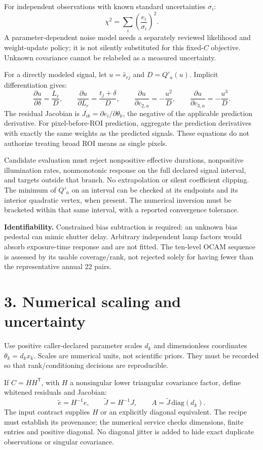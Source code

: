 \documentclass[11pt,a4paper]{article}
\begin{document}
For independent observations with known standard uncertainties $\sigma_i$:
\[
\chi^2=\sum_i\left(\frac{e_i}{\sigma_i}\right)^2 .
\]
A parameter-dependent noise model needs a separately reviewed likelihood and
weight-update policy; it is not silently substituted for this fixed-$C$ objective.
Unknown covariance cannot be relabeled as a measured uncertainty.

For a directly modeled signal, let $u=\widehat s_{rj}$ and $D=Q'_a(u)$.
Implicit differentiation gives:
\[
\frac{\partial u}{\partial\delta}=\frac{L_r}{D},
\qquad
\frac{\partial u}{\partial L_r}=\frac{t_j+\delta}{D},
\qquad
\frac{\partial u}{\partial c_{2,a}}=-\frac{u^2}{D},
\qquad
\frac{\partial u}{\partial c_{3,a}}=-\frac{u^3}{D}.
\]
The residual Jacobian is $J_{ik}=\partial e_i/\partial\theta_k$, the negative of
the applicable prediction derivative. For pixel-before-ROI prediction, aggregate
the prediction derivatives with exactly the same weights as the predicted
signals. These equations do not authorize treating broad ROI means as single pixels.

Candidate evaluation must reject nonpositive effective durations, nonpositive
illumination rates, nonmonotonic response on the full declared signal interval,
and targets outside that branch. No extrapolation or silent coefficient clipping.
The minimum of $Q'_a$ on an interval can be checked at its endpoints and its
interior quadratic vertex, when present. The numerical inversion must be
bracketed within that same interval, with a reported convergence tolerance.

\textbf{Identifiability.} Constrained bias subtraction is required: an unknown
bias pedestal can mimic shutter delay. Arbitrary independent lamp factors would
absorb exposure-time response and are not fitted. The ten-level OCAM sequence is
assessed by its usable coverage/rank, not rejected solely for having fewer than
the representative annual 22 pairs.

\section*{3. Numerical scaling and uncertainty}
Use positive caller-declared parameter scales $d_k$ and dimensionless coordinates
$\theta_k=d_k x_k$. Scales are numerical units, not scientific priors.
They must be recorded so that rank/conditioning decisions are reproducible.

If $C=HH^{\mathsf T}$, with $H$ a nonsingular lower triangular covariance
factor, define whitened residuals and Jacobian:
\[
\widetilde e=H^{-1}e,\qquad
\widetilde J=H^{-1}J,\qquad
A=\widetilde J\,\mathrm{diag}(d_k).
\]
The input contract supplies $H$ or an explicitly diagonal equivalent.
The recipe must establish its provenance; the numerical service checks
dimensions, finite entries and positive diagonal. No diagonal jitter is added
to hide exact duplicate observations or singular covariance.
\end{document}
